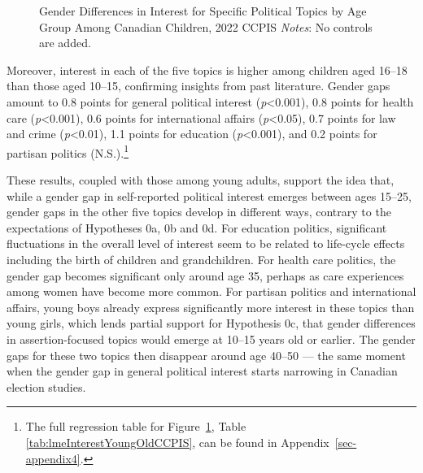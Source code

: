 \documentclass[
  letterpaper,
  DIV=11,
  numbers=noendperiod]{scrreprt}
\begin{document}
\begin{figure}


\caption{\label{fig-interestyoungold}Gender Differences in Interest for
Specific Political Topics by Age Group Among Canadian Children, 2022
CCPIS \newline \textit{Notes}: No controls are added.}

\end{figure}%

Moreover, interest in each of the five topics is higher among children
aged 16--18 than those aged 10--15, confirming insights from past
literature. Gender gaps amount to 0.8 points for general political
interest (\emph{p}\textless0.001), 0.8 points for health care
(\emph{p}\textless0.001), 0.6 points for international affairs
(\emph{p}\textless0.05), 0.7 points for law and crime
(\emph{p}\textless0.01), 1.1 points for education
(\emph{p}\textless0.001), and 0.2 points for partisan politics
(N.S.).\footnote{The full regression table for
  Figure~\ref{fig-interestyoungold}, Table
  \ref{tab:lmeInterestYoungOldCCPIS}, can be found in
  Appendix~\ref{sec-appendix4}.}

These results, coupled with those among young adults, support the idea
that, while a gender gap in self-reported political interest emerges
between ages 15--25, gender gaps in the other five topics develop in
different ways, contrary to the expectations of Hypotheses 0a, 0b and
0d. For education politics, significant fluctuations in the overall
level of interest seem to be related to life-cycle effects including the
birth of children and grandchildren. For health care politics, the
gender gap becomes significant only around age 35, perhaps as care
experiences among women have become more common. For partisan politics
and international affairs, young boys already express significantly more
interest in these topics than young girls, which lends partial support
for Hypothesis 0c, that gender differences in assertion-focused topics
would emerge at 10--15 years old or earlier. The gender gaps for these
two topics then disappear around age 40--50 --- the same moment when the
gender gap in general political interest starts narrowing in Canadian
election studies.
\end{document}
